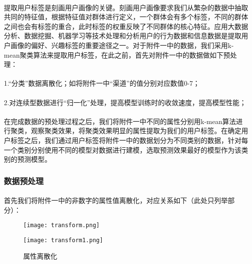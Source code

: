 \documentclass[a4paper]{article}
\begin{document}
				\paragraph{}提取用户标签是刻画用户画像的关键。刻画用户画像要求我们从繁杂的数据中抽取共同的特征值，根据特征值对群体进行定义，一个群体会有多个标签，不同的群体之间也会有标签的重合，此时标签的权重反映了不同群体的核心特征。应用大数据分析、数据挖掘、机器学习等技术处理和分析用户的行为数据和信息数据是提取用户画像的偏好、兴趣标签的重要途径之一。对于附件一中的数据，我们采用k-mean聚类算法来提取用户标签，在此之前，首先对附件一中的数据做如下预处理：
				\paragraph{}1.“分类”数据离散化；如将附件一中“渠道”的值分别对应数值0-7；
				\paragraph{}2.对连续型数据进行“归一化”处理，提高模型训练时的收敛速度，提高模型性能；
				\paragraph{}在完成数据的预处理过程之后，我们将附件一中不同的属性分别用k-mean算法进行聚类，观察聚类效果，将聚类效果明显的属性提取为我们的用户标签。在确定用户标签之后，我们通过用户标签将附件一中的数据划分为不同类别的数据，针对每一个类别分别使用不同的模型对数据进行建模，选取预测效果最好的模型作为该类别的预测模型。	
			\subsubsection{数据预处理}
			\paragraph{}首先我们将附件一中的非数字的属性值离散化，对应关系如下（此处只列举部分）：
				\begin{figure}[ht]	
					\centering
					\texttt{[image: transform.png]}
				\end{figure}
			
				\begin{figure}[H]
					\centering
					\texttt{[image: transform1.png]}
					\caption{属性离散化}
					\label{fig:label}
				\end{figure}
\end{document}
